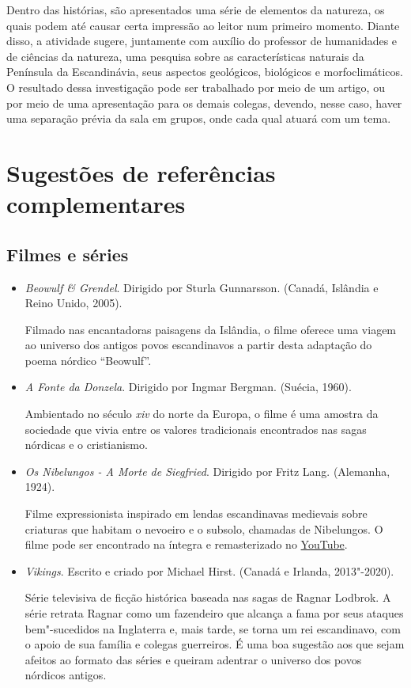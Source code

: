 \documentclass[12pt]{extarticle}
\begin{document}
Dentro das histórias, são apresentados uma série de elementos da
natureza, os quais podem até causar certa impressão ao leitor num
primeiro momento. Diante disso, a atividade sugere, juntamente com
auxílio do professor de humanidades e de ciências da natureza, uma
pesquisa sobre as características naturais da Península da
Escandinávia, seus aspectos geológicos, biológicos e morfoclimáticos.
O resultado dessa investigação pode ser trabalhado por meio de um
artigo, ou por meio de uma apresentação para os demais colegas,
devendo, nesse caso, haver uma separação prévia da sala em grupos,
onde cada qual atuará com um tema.

\section{Sugestões de referências complementares}\label{sugestoes}

\subsection{Filmes e séries}

\begin{itemize}

\item\textit{Beowulf & Grendel}. Dirigido por Sturla Gunnarsson. (Canadá, Islândia e Reino Unido, 2005).

Filmado nas encantadoras paisagens da Islândia, o filme oferece uma viagem ao universo dos 
antigos povos escandinavos a partir desta adaptação do poema nórdico ``Beowulf''.

\item\textit{A Fonte da Donzela}. Dirigido por Ingmar Bergman. (Suécia, 1960).

Ambientado no século \textit{xiv} do norte da Europa, o filme é uma amostra da sociedade
que vivia entre os valores tradicionais encontrados nas sagas nórdicas e o cristianismo.

\item\textit{Os Nibelungos - A Morte de Siegfried}. Dirigido por Fritz Lang. (Alemanha, 1924).

Filme expressionista inspirado em lendas escandinavas medievais sobre criaturas que habitam o 
nevoeiro e o subsolo, chamadas de Nibelungos. O filme pode ser encontrado na íntegra 
e remasterizado no \href{https://www.youtube.com/watch?v=HH1BjSZYJ-w}{YouTube}.

\item\textit{Vikings}. Escrito e criado por Michael Hirst. (Canadá e Irlanda, 2013"-2020).

Série televisiva de ficção histórica baseada nas sagas de Ragnar Lodbrok. A série retrata 
Ragnar como um fazendeiro que alcança a fama por seus ataques bem"-sucedidos na Inglaterra e, 
mais tarde, se torna um rei escandinavo, com o apoio de sua família e colegas guerreiros. 
É uma boa sugestão aos que sejam afeitos ao formato das séries e queiram adentrar 
o universo dos povos nórdicos antigos.

\end{itemize}
\end{document}

